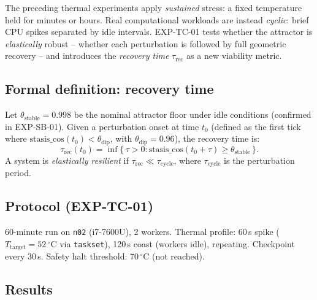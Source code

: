 \documentclass[11pt, a4paper]{article}
\begin{document}
The preceding thermal experiments apply \emph{sustained} stress: a fixed
temperature held for minutes or hours.  Real computational workloads are
instead \emph{cyclic}: brief CPU spikes separated by idle intervals.
EXP-TC-01 tests whether the attractor is \emph{elastically} robust -- whether
each perturbation is followed by full geometric recovery -- and introduces
the \emph{recovery time} $\tau_\text{rec}$ as a new viability metric.

\subsection{Formal definition: recovery time}

Let $\theta_\text{stable} = 0.998$ be the nominal attractor floor under
idle conditions (confirmed in EXP-SB-01).  Given a perturbation onset at
time $t_0$ (defined as the first tick where
$\text{stasis\_cos}(t_0) < \theta_\text{dip}$, with $\theta_\text{dip} =
0.96$), the recovery time is:
\begin{equation}
  \tau_\text{rec}(t_0) = \inf\{\,\tau > 0 :
    \text{stasis\_cos}(t_0 + \tau) \geq \theta_\text{stable}\,\}.
  \label{eq:tau_rec}
\end{equation}
A system is \emph{elastically resilient} if $\tau_\text{rec} \ll
\tau_\text{cycle}$, where $\tau_\text{cycle}$ is the perturbation period.

\subsection{Protocol (EXP-TC-01)}

60-minute run on \texttt{n02} (i7-7600U), 2 workers.  Thermal profile:
60\,s spike ($T_\text{target}=52\,^\circ$C via \texttt{taskset}), 120\,s
coast (workers idle), repeating.  Checkpoint every 30\,s.
Safety halt threshold: 70\,$^\circ$C (not reached).

\subsection{Results}
\end{document}
